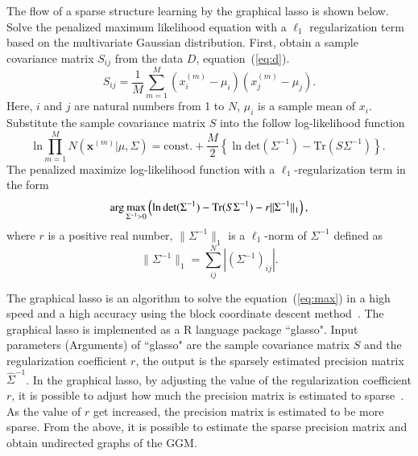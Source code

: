 \documentclass{sig-alternate-10pt}
\begin{document}
The flow of a sparse structure learning by the graphical lasso is shown below.
Solve the penalized maximum likelihood equation with a $\ell_1$ regularization term based on the multivariate Gaussian distribution.
First, obtain a sample covariance matrix $S_{ij}$ from the data $D$, equation~(\ref{eq:d}).
\begin{equation}
\label{eq:s}
S_{ij}=\frac{1}{M}\sum_{m=1}^{M}(x_{i}^{(m)}-\mu_{i})(x_{j}^{(m)}-\mu_{j}).
\end{equation}
Here, $i$ and $j$ are natural numbers from 1 to $N$, $\mu_i$ is a sample mean of $x_i$.
Substitute the sample covariance matrix $S$ into the follow log-likelihood function
\begin{equation*} 
\mathrm{ln}{\prod_{m=1}^{M}}{N(\bm{x}^{(m)}|\mu,\Sigma)}=\mbox{const.}+\frac{M}{2}\left\{{\ln\mathrm{det}(\Sigma^{-1})}-\mathrm{Tr}(S\Sigma^{-1})\right\}.
\end{equation*}
The penalized maximize log-likelihood function with a $\ell_1$-regularization term in the form
\begin{equation} 
\label{eq:max} 
{\rm arg}\mathop{\rm max}\limits_{\Sigma^{-1} \succ 0} \left({\ln\mathrm{det}(\Sigma^{-1})}-\mathrm{Tr}(S\Sigma^{-1})-r||\Sigma^{-1}||_{1}\right),
\end{equation}
where $r$ is a positive real number, $\|\Sigma^{-1}\|_{1}$ is a $\ell_1$-norm of $\Sigma^{-1}$ defined as
\begin{equation*}
	\|\Sigma^{-1}\|_{1}={\sum_{ij}^{N}}|(\Sigma^{-1})_{ij}|.
\end{equation*}

The graphical lasso is an algorithm to solve the equation~(\ref{eq:max}) in a high speed and a high accuracy using the block coordinate descent method~\cite{Banerjee}.
The graphical lasso is implemented as a R language package ``glasso".
Input parameters (Arguments) of ``glasso" are the sample covariance matrix $S$ and the regularization coefficient $r$, the output is the sparsely estimated precision matrix $\hat{\Sigma}^{-1}$.
In the graphical lasso, by adjusting the value of the regularization coefficient $r$, it is possible to adjust how much the precision matrix is estimated to sparse~\cite{Tibshirani}.
As the value of $r$ get increased, the precision matrix is estimated to be more sparse.
From the above, it is possible to estimate the sparse precision matrix and obtain undirected graphs of the GGM.
\end{document}
